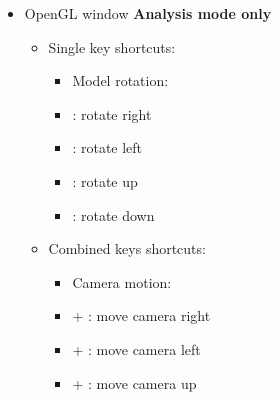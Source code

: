{\begin{itemize}
\begin{itemize}
\begin{itemize}
\item[] \Ctrl +  : create new (empty project) \\
\item Misc: \\
\item[] \Ctrl +  : label / unlabel all atoms 
\item[] \Ctrl +  :  window [Sec.~\ref{ecw}]
\item[] \Ctrl +  :  dialog [Sec.~\ref{mdw}]
\item[] \Ctrl +  :  dialog [Sec.~\ref{rdw}]
\item[] \Ctrl +  : enter / exit fullscreen mode \\ 
\item Camero motion: \\
\item[] \Shift + \UArrow : zoom out
\item[] \Shift + \DArrow : zoom in \\
\end{itemize}
\end{itemize}
\item OpenGL window {\bf{Analysis mode only}}
\begin{itemize}
\item Single key shortcuts: \\
\begin{itemize}
\item Model rotation: \\
\item[] \RArrow : rotate right
\item[] \LArrow : rotate left
\item[] \UArrow : rotate up
\item[] \DArrow : rotate down \\
\end{itemize}
\newpage
\item Combined keys shortcuts: \\
\begin{itemize}
\item Camera motion: \\
\item[] \Ctrl + \RArrow : move camera right
\item[] \Ctrl + \LArrow : move camera left
\item[] \Ctrl + \UArrow : move camera up

\end{itemize}
\end{itemize}
\end{itemize}}
